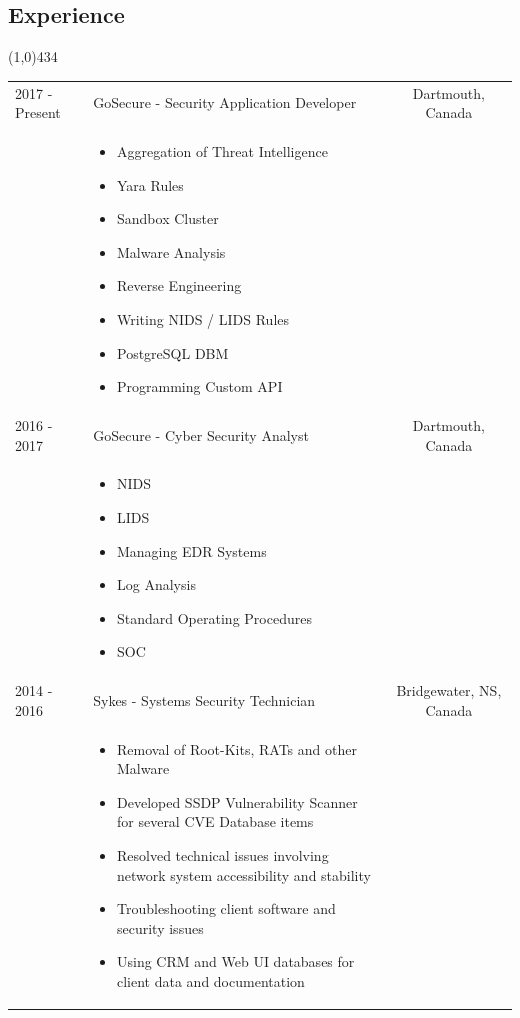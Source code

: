 \documentclass{res}
\newcommand{\frstCVcell}{2.5cm}
\begin{document}
\begin{resume}
  \section{Experience}
  \line(1,0){434}
  \newline
  \newline
  \begin{tabularx}{\textwidth}{p{\frstCVcell}Xc}
    2017 - Present & GoSecure - Security Application Developer & Dartmouth, Canada\\
    &
    \begin{itemize}
    \item Aggregation of Threat Intelligence
    \item Yara Rules
    \item Sandbox Cluster
    \item Malware Analysis
    \item Reverse Engineering
    \item Writing NIDS / LIDS Rules
    \item PostgreSQL DBM
    \item Programming Custom API
    \end{itemize}
    & \\
    2016 - 2017 & GoSecure - Cyber Security Analyst & Dartmouth, Canada\\
    &
    \begin{itemize}
    \item NIDS
    \item LIDS
    \item Managing EDR Systems
    \item Log Analysis
    \item Standard Operating Procedures
    \item SOC
    \end{itemize}
    & \\
    2014 - 2016 & Sykes - Systems Security Technician & Bridgewater, NS, Canada\\
    &
    \begin{itemize}
    \item Removal of Root-Kits, RATs and other Malware
    \item Developed SSDP Vulnerability Scanner for several CVE Database items
    \item Resolved technical issues involving network system accessibility and stability
    \item Troubleshooting client software and security issues
    \item Using CRM and Web UI databases for client data and documentation

\end{itemize}
\end{tabularx}
\end{resume}
\end{document}
